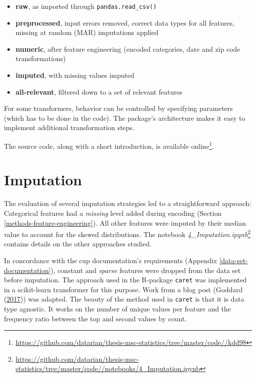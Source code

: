 \documentclass[
  11pt,
  a4paper,
  DIV=12,captions=tableheading,oneside,titlepage]{scrbook}
\providecommand{\tightlist}{%
  \setlength{\itemsep}{0pt}\setlength{\parskip}{0pt}}
\begin{document}
\begin{itemize}
\tightlist
\item
  \textbf{raw}, as imported through \texttt{pandas.read\_csv()}
\item
  \textbf{preprocessed}, input errors removed, correct data types for all features, missing at random (MAR) imputations applied
\item
  \textbf{numeric}, after feature engineering (encoded categories, date and zip code transformations)
\item
  \textbf{imputed}, with missing values imputed
\item
  \textbf{all-relevant}, filtered down to a set of relevant features
\end{itemize}

For some transformers, behavior can be controlled by specifying parameters (which has to be done in the code). The package's architecture makes it easy to implement additional transformation steps.

The source code, along with a short introduction, is available online\footnote{\url{https://github.com/datarian/thesis-msc-statistics/tree/master/code//kdd98}}.

\hypertarget{imputation-1}{%
\section{Imputation}\label{imputation-1}}

The evaluation of several imputation strategies led to a straightforward approach: Categorical features had a \emph{missing} level added during encoding (Section \ref{methods-feature-engineering}). All other features were imputed by their median value to account for the skewed distributions. The notebook \emph{4\_Imputation.ipynb}\footnote{\url{https://github.com/datarian/thesis-msc-statistics/tree/master/code//notebooks/4_Imputation.ipynb}} contains details on the other approaches studied.

In concordance with the cup documentation's requirements (Appendix \ref{data-set-documentation}), constant and \emph{sparse} features were dropped from the data set before imputation. The approach used in the R-package \texttt{caret} was implemented in a scikit-learn transformer for this purpose. Work from a blog post (Goddard (\protect\hyperlink{ref-goddard2017variance}{2017})) was adapted. The beauty of the method used in \texttt{caret} is that it is data type agnostic. It works on the number of unique values per feature and the frequency ratio between the top and second values by count.
\end{document}
